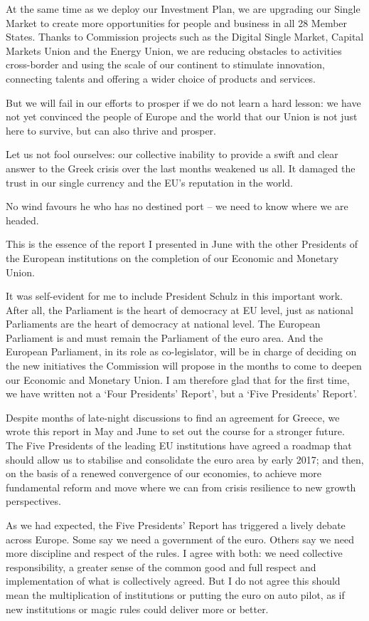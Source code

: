 \documentclass[a4paper,11pt]{article}
\begin{document}
At the same time as we deploy our Investment Plan, we are upgrading our Single Market to create more opportunities for people and business in all 28 Member States. Thanks to Commission projects such as the Digital Single Market, Capital Markets Union and the Energy Union, we are reducing obstacles to activities cross-border and using the scale of our continent to stimulate innovation, connecting talents and offering a wider choice of products and services.

But we will fail in our efforts to prosper if we do not learn a hard lesson: we have not yet convinced the people of Europe and the world that our Union is not just here to survive, but can also thrive and prosper.

Let us not fool ourselves: our collective inability to provide a swift and clear answer to the Greek crisis over the last months weakened us all. It damaged the trust in our single currency and the EU’s reputation in the world.

No wind favours he who has no destined port – we need to know where we are headed.

This is the essence of the report I presented in June with the other Presidents of the European institutions on the completion of our Economic and Monetary Union.

It was self-evident for me to include President Schulz in this important work. After all, the Parliament is the heart of democracy at EU level, just as national Parliaments are the heart of democracy at national level. The European Parliament is and must remain the Parliament of the euro area. And the European Parliament, in its role as co-legislator, will be in charge of deciding on the new initiatives the Commission will propose in the months to come to deepen our Economic and Monetary Union. I am therefore glad that for the first time, we have written not a ‘Four Presidents' Report’, but a ‘Five Presidents’ Report’.

Despite months of late-night discussions to find an agreement for Greece, we wrote this report in May and June to set out the course for a stronger future. The Five Presidents of the leading EU institutions have agreed a roadmap that should allow us to stabilise and consolidate the euro area by early 2017; and then, on the basis of a renewed convergence of our economies, to achieve more fundamental reform and move where we can from crisis resilience to new growth perspectives.

As we had expected, the Five Presidents’ Report has triggered a lively debate across Europe. Some say we need a government of the euro. Others say we need more discipline and respect of the rules. I agree with both: we need collective responsibility, a greater sense of the common good and full respect and implementation of what is collectively agreed. But I do not agree this should mean the multiplication of institutions or putting the euro on auto pilot, as if new institutions or magic rules could deliver more or better.
\end{document}
